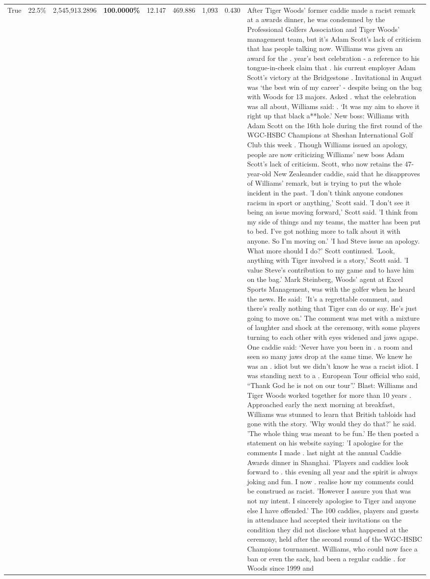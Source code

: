 \begin{table}[H]
\begin{tabular}{lllrlllll}
True & 22.5\% & 2,545,913.2896 & \bfseries \color{red} 100.0000\% & 12.147 & 469.886 & 1,093 & 0.430 & After Tiger Woods' former caddie made a racist remark at a awards dinner, he was condemned by the Professional Golfers Association and Tiger Woods' management team, but it's Adam Scott's lack of criticism that has people talking now. Williams was given an award for the . year’s best celebration - a reference to his tongue-in-cheek claim that . his current employer Adam Scott’s victory at the Bridgestone . Invitational in August was ‘the best win of my career’ - despite being on the bag with Woods for 13 majors. Asked . what the celebration was all about, Williams said: . ‘It was my aim to shove it right up that black a**hole.’ New boss: Williams with Adam Scott  on the 16th hole during the first round of the WGC-HSBC Champions at Sheshan International Golf Club this week . Though Williams issued an apology, people are now criticizing Williams' new boss Adam Scott's lack of criticism. Scott, who now retains the 47-year-old New Zealeander caddie, said that he disapproves of Williams' remark, but is trying to put the whole incident in the past. 'I don't think anyone condones racism in sport or anything,' Scott said. 'I don't see it being an issue moving forward,' Scott said. 'I think from my side of things and my teams, the matter has been put to bed. I've got nothing more to talk about it with anyone. So I'm moving on.' 'I had Steve issue an apology. What more should I do?' Scott continued. 'Look, anything with Tiger involved is a story,' Scott said. 'I value Steve's contribution to my game and to have him on the bag.' Mark Steinberg, Woods' agent at Excel Sports Management, was with the golfer when he heard the news. He said: 'It's a regrettable comment, and there's really nothing that Tiger can do or say. He's just going to move on.' The comment was met with a mixture of laughter and shock at the ceremony, with some players turning to each other with eyes widened and jaws agape. One caddie said: ‘Never have you been in . a room and seen so many jaws drop at the same time. We knew he was an . idiot but we didn’t know he was a racist idiot. I was standing next to a . European Tour official who said, “Thank God he is not on our tour”.’ Blast: Williams and Tiger Woods worked together for more than 10 years . Approached early the next morning at breakfast, Williams was stunned to learn that British tabloids had gone with the story. 'Why would they do that?' he said. 'The whole thing was meant to be fun.' He then posted a statement on his website saying: 'I apologise for the comments I made . last night at the annual Caddie Awards dinner in Shanghai. 'Players and caddies look forward to . this evening all year and the spirit is always joking and fun. I now . realise how my comments could be construed as racist. 'However I assure you that was not my intent. I sincerely apologise to Tiger and anyone else I have offended.' The 100 caddies, players and guests in attendance had accepted their invitations on the condition they did not disclose what happened at the ceremony, held after the second round of the WGC-HSBC Champions tournament. Williams, who could now face a ban or even the sack, had been a regular caddie . for Woods since 1999 and 
\end{tabular}
\end{table}
